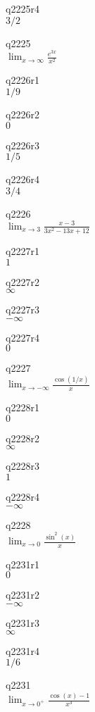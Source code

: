 q2225r4\\
\(\displaystyle 3/2 \)

q2225\\
\(\displaystyle \lim_{x \rightarrow \infty} \frac{e^{3x}}{x^2} \)

q2226r1\\
\(\displaystyle 1/9 \)

q2226r2\\
\(\displaystyle 0 \)

q2226r3\\
\(\displaystyle 1/5 \)

q2226r4\\
\(\displaystyle 3/4 \)

q2226\\
\(\displaystyle \lim_{x \rightarrow 3} \frac{x-3}{3x^2 - 13x + 12} \)

q2227r1\\
\(\displaystyle 1 \)

q2227r2\\
\(\displaystyle \infty \)

q2227r3\\
\(\displaystyle -\infty \)

q2227r4\\
\(\displaystyle 0 \)

q2227\\
\(\displaystyle \lim_{x \rightarrow -\infty} \frac{\cos(1/x)}{x} \)

q2228r1\\
\(\displaystyle 0 \)

q2228r2\\
\(\displaystyle \infty \)

q2228r3\\
\(\displaystyle 1 \)

q2228r4\\
\(\displaystyle -\infty \)

q2228\\
\(\displaystyle \lim_{x \rightarrow 0} \frac{\sin^2 (x)}{x} \)

q2231r1\\
\(\displaystyle 0 \)

q2231r2\\
\(\displaystyle -\infty \)

q2231r3\\
\(\displaystyle \infty \)

q2231r4\\
\(\displaystyle 1/6 \)

q2231\\
\(\displaystyle \lim_{x \rightarrow 0^+} \frac{\cos(x) - 1}{x^3} \)

